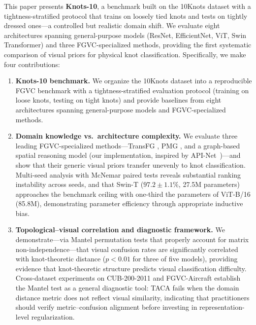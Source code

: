 \documentclass[preprint,review,12pt]{elsarticle}
\begin{document}
This paper presents \textbf{Knots-10}, a benchmark built on the 10Knots dataset \citep{cameron2018tenknots} with a tightness-stratified protocol that trains on loosely tied knots and tests on tightly dressed ones---a controlled but realistic domain shift. We evaluate eight architectures spanning general-purpose models (ResNet, EfficientNet, ViT, Swin Transformer) and three FGVC-specialized methods, providing the first systematic comparison of visual priors for physical knot classification. Specifically, we make four contributions:

\begin{enumerate}
    \item \textbf{Knots-10 benchmark.} We organize the 10Knots dataset \citep{cameron2018tenknots} into a reproducible FGVC benchmark with a tightness-stratified evaluation protocol (training on loose knots, testing on tight knots) and provide baselines from eight architectures spanning general-purpose models and FGVC-specialized methods.

    \item \textbf{Domain knowledge vs.\ architecture complexity.} We evaluate three leading FGVC-specialized methods---TransFG \citep{he2022transfg}, PMG \citep{du2020pmg}, and a graph-based spatial reasoning model (our implementation, inspired by API-Net~\citep{zhuang2020apinet})---and show that their generic visual priors transfer unevenly to knot classification. Multi-seed analysis with McNemar paired tests reveals substantial ranking instability across seeds, and that Swin-T ($97.2 \pm 1.1\%$, 27.5M parameters) approaches the benchmark ceiling with one-third the parameters of ViT-B/16 (85.8M), demonstrating parameter efficiency through appropriate inductive bias.

    \item \textbf{Topological--visual correlation and diagnostic framework.} We demonstrate---via Mantel permutation tests \citep{mantel1967} that properly account for matrix non-independence---that visual confusion rates are significantly correlated with knot-theoretic distance ($p < 0.01$ for three of five models), providing evidence that knot-theoretic structure predicts visual classification difficulty. Cross-dataset experiments on CUB-200-2011 \citep{wah2011cub} and FGVC-Aircraft \citep{maji2013fgvcaircraft} establish the Mantel test as a general diagnostic tool: TACA fails when the domain distance metric does not reflect visual similarity, indicating that practitioners should verify metric--confusion alignment before investing in representation-level regularization.


\end{enumerate}
\end{document}
